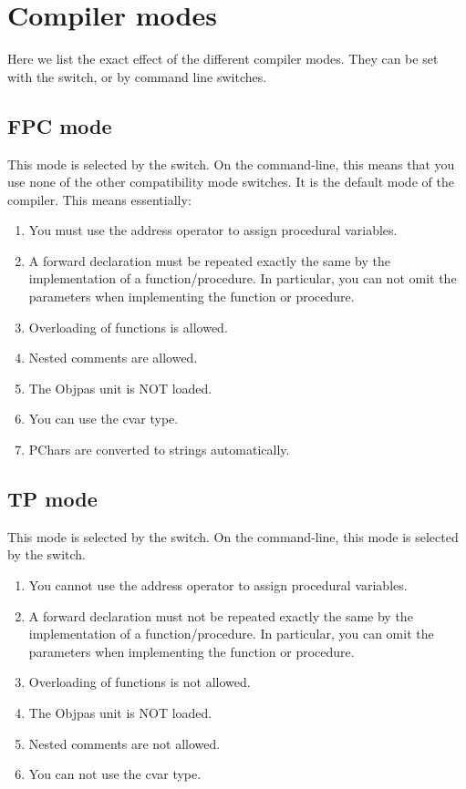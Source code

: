 \chapter{Compiler modes}
\label{ch:AppD}

Here we list the exact effect of the different compiler modes. They can be
set with the  switch, or by command line switches.

\section{FPC mode}
This mode is selected by the  switch. On the command-line,
this means that you use none of the other compatibility mode switches.
It is the default mode of the compiler. This means essentially:
\begin{enumerate}
\item You must use the address operator to assign procedural variables.
\item A forward declaration must be repeated exactly the same by the
implementation of a function/procedure. In particular, you can not omit the
parameters when implementing the function or procedure.
\item Overloading of functions is allowed.
\item Nested comments are allowed.
\item The Objpas unit is NOT loaded.
\item You can use the cvar type.
\item PChars are converted to strings automatically.
\end{enumerate}
\section{TP mode}
This mode is selected by the  switch. On the command-line,
this mode is selected by the  switch.

\begin{enumerate}
\item You cannot use the address operator to assign procedural variables.
\item A forward declaration must not be repeated exactly the same by the
implementation of a function/procedure. In particular, you can omit the
parameters when implementing the function or procedure.
\item Overloading of functions is not allowed.
\item The Objpas unit is NOT loaded.
\item Nested comments are not allowed.
\item You can not use the cvar type.
\end{enumerate}

